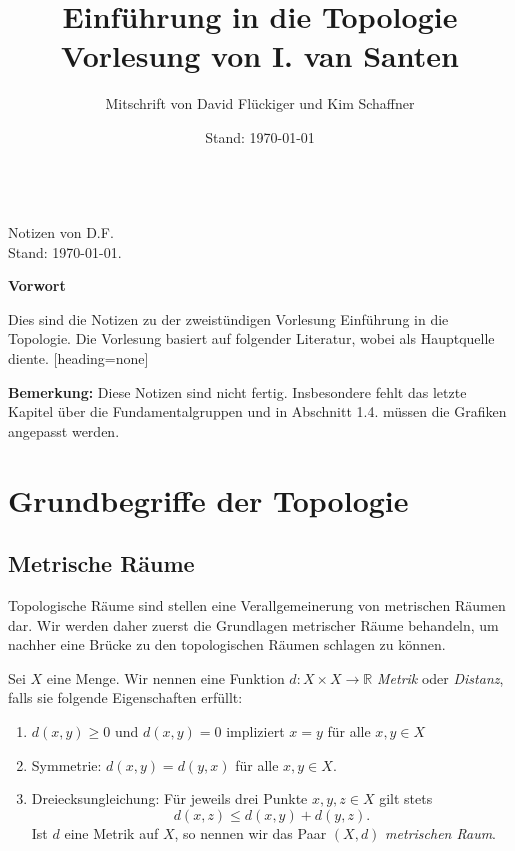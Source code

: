 \documentclass[
12pt, 
openany, 
a4paper, 
final,
fleqn, 
]{myclass}
\title{Einführung in die Topologie\\Vorlesung von I. van Santen\pagenumbering{arabic}}
\author[D. Flückiger]
{Mitschrift von David Flückiger und Kim Schaffner}
\date{Stand: \today}
\numberwithin{equation}{chapter}
\numberwithin{section}{chapter}
\newcommand{\RR}{\mathbb R}
\newcommand{\printbibliography}{}
\newcommand{\bibfont}{}
\renewcommand{\cite}[2][]{}
\begin{document}



\makeatletter
\begin{center}
	{{\huge{\@title}}}\\[3.5mm]
	\Large{Notizen von D.F.\\ Stand: \today.}
\end{center}
\makeatother
\vspace{0.5cm}
\thispagestyle{empty}
\begin{center}
	{\large\bf Vorwort}
\end{center}
\vspace{1mm}
Dies sind die Notizen zu der zweistündigen Vorlesung \glqq Einführung in die Topologie\grqq. Die Vorlesung basiert auf folgender Literatur, wobei \cite{laures_grundkurs_2023}\nocite{*} als Hauptquelle diente. 
\vspace{5pt}
\begingroup
\let\clearpage\relax
\renewcommand*{\bibfont}{\footnotesize}
\printbibliography[heading=none]
\endgroup
\vspace{1cm}
{
\color{red}
\noindent\textbf{Bemerkung: }Diese Notizen sind nicht fertig. Insbesondere fehlt das letzte Kapitel
über die Fundamentalgruppen und in Abschnitt 1.4. müssen die Grafiken angepasst
werden.

}
\tableofcontents
\chapter{Grundbegriffe der Topologie}
\section{Metrische Räume}
Topologische Räume sind stellen eine Verallgemeinerung von metrischen Räumen dar. Wir werden daher zuerst die Grundlagen metrischer Räume behandeln, um nachher eine Brücke zu den topologischen Räumen schlagen zu können. 
\begin{defn}\label{1.1}
Sei $X$ eine Menge. Wir nennen eine Funktion $d: X\times X \to \RR$ \emph{Metrik} oder \emph{Distanz}, falls sie folgende Eigenschaften erfüllt: 
\begin{enumerate}[label=(M\arabic*)]
\item $d(x, y) \geq 0$ und $d(x, y) = 0$ impliziert $x=y$ für alle $x, y\in X$

\item Symmetrie: $d(x, y) = d(y, x)$ für alle $x, y\in X$.

\item Dreiecksungleichung: Für jeweils drei Punkte $x, y, z\in X$ gilt stets
\[
d(x, z) \leq d(x, y) + d(y, z).
\]
Ist $d$ eine Metrik auf $X$, so nennen wir das Paar $(X, d)$ \emph{metrischen Raum}.
\end{enumerate}
\end{defn}
\end{document}
